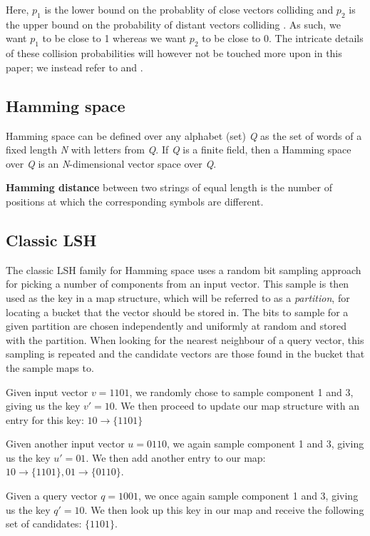 Here, $p_1$ is the lower bound on the probablity of close vectors colliding and $p_2$ is the upper bound on the probability of distant vectors colliding \cite[p. 100]{DBLP:books/cu/LeskovecRU14}. As such, we want $p_1$ to be close to 1 whereas we want $p_2$ to be close to 0. The intricate details of these collision probabilities will however not be touched more upon in this paper; we instead refer to \cite{DBLP:conf/stoc/IndykM98} and \cite{DBLP:books/cu/LeskovecRU14}.

\subsection{Hamming space}
Hamming space can be defined over any alphabet (set) \textit{Q} as the set of words of a fixed length \textit{N} with letters from \textit{Q}. If \textit{Q} is a finite field, then a Hamming space over \textit{Q} is an \textit{N}-dimensional vector space over \textit{Q}.

\textbf{Hamming distance} between two strings of equal length is the number of positions at which the corresponding symbols are different.

\subsection{Classic LSH}
\label{background-classic-lsh}

The classic LSH family for Hamming space uses a random bit sampling approach for picking a number of components from an input vector. This sample is then used as the key in a map structure, which will be referred to as a \textit{partition}, for locating a bucket that the vector should be stored in. The bits to sample for a given partition are chosen independently and uniformly at random and stored with the partition. When looking for the nearest neighbour of a query vector, this sampling is repeated and the candidate vectors are those found in the bucket that the sample maps to.

\begin{example}
\label{example-classic-sampling}
  Given input vector $v = 1101$, we randomly chose to sample component 1 and 3, giving us the key $v' = 10$. We then proceed to update our map structure with an entry for this key: $10 \rightarrow \{1101\}$

  Given another input vector $u = 0110$, we again sample component 1 and 3, giving us the key $u' = 01$. We then add another entry to our map: $10 \rightarrow \{1101\}, 01 \rightarrow \{0110\}$.

  Given a query vector $q = 1001$, we once again sample component 1 and 3, giving us the key $q' = 10$. We then look up this key in our map and receive the following set of candidates: $\{1101\}$.
\end{example}

